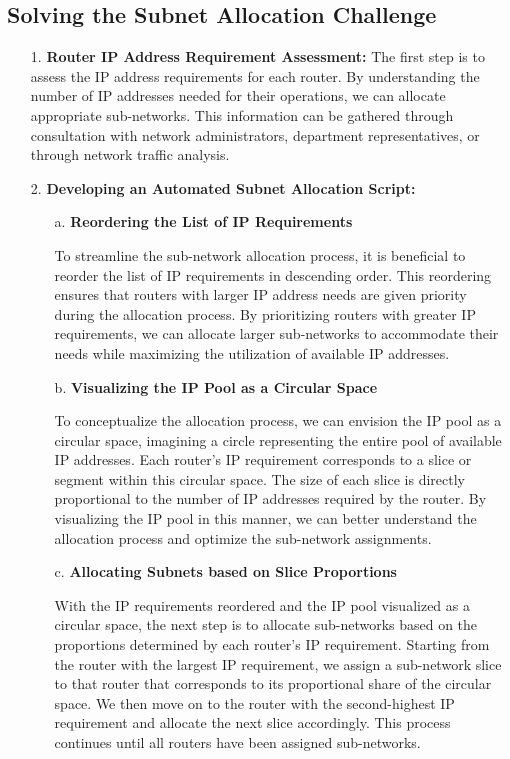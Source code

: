 \subsection{Solving the Subnet Allocation Challenge}

\begin{itemize}
    \item[1.] \textbf{Router IP Address Requirement Assessment:} The first step is to assess the IP address requirements for each router. By understanding the number of IP addresses needed for their operations, we can allocate appropriate sub-networks. This information can be gathered through consultation with network administrators, department representatives, or through network traffic analysis.
    \item[2.] \textbf{Developing an Automated Subnet Allocation Script:}
    
    \begin{itemize}
        \item[a.] \textbf{Reordering the List of IP Requirements}

        To streamline the sub-network allocation process, it is beneficial to reorder the list of IP requirements in descending order. This reordering ensures that routers with larger IP address needs are given priority during the allocation process. By prioritizing routers with greater IP requirements, we can allocate larger sub-networks to accommodate their needs while maximizing the utilization of available IP addresses.

        \item[b.] \textbf{Visualizing the IP Pool as a Circular Space}

        To conceptualize the allocation process, we can envision the IP pool as a circular space, imagining a circle representing the entire pool of available IP addresses. Each router's IP requirement corresponds to a slice or segment within this circular space. The size of each slice is directly proportional to the number of IP addresses required by the router. By visualizing the IP pool in this manner, we can better understand the allocation process and optimize the sub-network assignments.


        \item[c.] \textbf{Allocating Subnets based on Slice Proportions}

        With the IP requirements reordered and the IP pool visualized as a circular space, the next step is to allocate sub-networks based on the proportions determined by each router's IP requirement. Starting from the router with the largest IP requirement, we assign a sub-network slice to that router that corresponds to its proportional share of the circular space. We then move on to the router with the second-highest IP requirement and allocate the next slice accordingly. This process continues until all routers have been assigned sub-networks.


\end{itemize}
\end{itemize}

